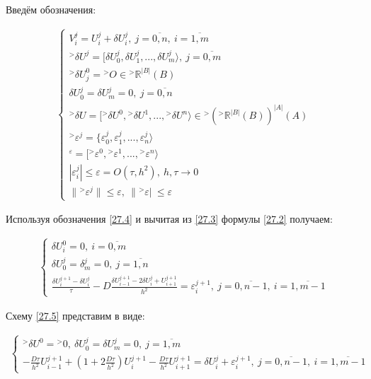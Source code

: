 \documentclass[__main__.tex]{subfiles}
\begin{document}
Введём обозначения:

\begin{gather}\label{27.4}
\begin{cases}
V^j_i = U^j_i + \delta U^j_i, \ j=\overline{0,n}, \ i=\overline{1,m} \\
{}^>\delta U^j = [ \delta U^j_0, \delta U^j_1, ..., \delta U^j_m \rangle, \ j = \overline{0,m} \\
{}^>\delta U^0_j = {}^> O \in {}^> \mathbb{R}^{\left|B\right|} \left(B\right) \\
\delta U^j_0 = \delta U^j_m = 0, \ j = \overline{0,n} \\
{}^> \delta U = [ {}^> \delta U^0, {}^> \delta U^1, ..., {}^> \delta U^n \rangle \in {}^>\left( {}^> \mathbb{R}^{\left| B \right|} \left(B\right) \right)^{\left|A\right|} \left(A\right) \\
{}^> \varepsilon^j = \{ \varepsilon^j_0,\varepsilon^j_1, ..., \varepsilon^j_n \rangle \\
{}^\varepsilon = [ {}^>\varepsilon^0, {}^>\varepsilon^1, ..., {}^>\varepsilon^n \rangle \\
\left| \varepsilon^j_i \right| \leq \varepsilon = O \left( \tau, h^2 \right), \ h,\tau \rightarrow 0 \\
\| {}^> \varepsilon^j \|  \leq \varepsilon, \ \| {}^>\varepsilon |\ \leq \varepsilon
\end{cases}
\end{gather}

Используя обозначения \ref{27.4} и вычитая из \ref{27.3} формулы \ref{27.2} получаем:

\begin{gather}\label{27.5}
\begin{cases}
\delta U^0_i = 0, \ i = \overline{0,m} \\
\delta U^j_0 = \delta^j_m = 0, \ j = \overline{1,n} \\
\frac{\delta U^{j+1}_i - \delta U^j_i}{\tau} - D \frac{\delta U^{j+1}_{i-1} - 2\delta U^j_i + U^{j+1}_{i+1}}{h^2} = \varepsilon^{j+1}_i, \ j= \overline{0,n-1}, \ i =\overline{1,m-1}
\end{cases}
\end{gather}

Схему \ref{27.5} представим в виде:

\begin{gather}\label{27.6}
\begin{cases}
{}^> \delta U^0 = {}^> 0, \ \delta U^j_0 = \delta U^j_m = 0, \ j = \overline{1,m} \\
- \frac{D\tau}{h^2} U^{j+1}_{i-1} + \left( 1 + 2 \frac{D\tau}{h^2} \right) U^{j+1}_i - \frac{D\tau}{h^2} U^{j+1}_{i+1} = \delta U^j_i + \varepsilon^{j+1}_i, \ j = \overline{0,n-1}, \ i= \overline{1,m-1}
\end{cases}
\end{gather}
\end{document}
